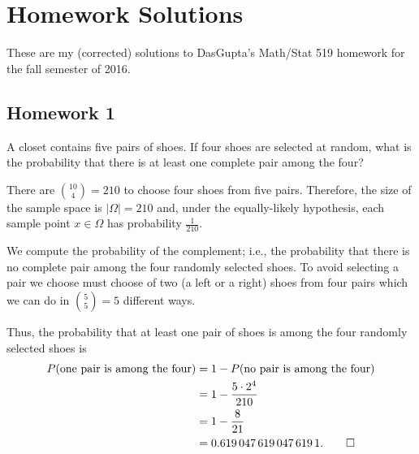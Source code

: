 \section{Homework Solutions}
These are my (corrected) solutions to DasGupta's Math/Stat 519 homework for
the fall semester of 2016.
\subsection{Homework 1}
\begin{problem}[Handout 1, \# 5]
  A closet contains five pairs of shoes. If four shoes are selected at
  random, what is the probability that there is at least one complete pair
  among the four?
\end{problem}
\begin{solution*}
  There are \(\binom{10}{4}=210\) to choose four shoes from five
  pairs. Therefore, the size of the sample space is \(|\Omega|=210\) and,
  under the equally-likely hypothesis, each sample point \(x\in\Omega\) has
  probability \(\frac{1}{210}\).

  We compute the probability of the complement; i.e., the probability that
  there is no complete pair among the four randomly selected shoes. To
  avoid selecting a pair we choose must choose of two (a left or a right)
  shoes from four pairs which we can do in \(\binom{5}{5}=5\) different
  ways.

  Thus, the probability that at least one pair of shoes is among the four
  randomly selected shoes is
  \begin{align*}
    P(\text{one pair is among the four})
    &=1-P(\text{no pair is among the four})\\
    &=1-\frac{5\cdot 2^4}{210}\\
    &=1-\frac{8}{21}\\
    &=\num{0.6190476190476191}.\qedhere
  \end{align*}
\end{solution*}

